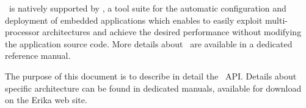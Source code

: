 \ee\ is natively supported by \rtd, a tool suite for the automatic
configuration and deployment of embedded applications which enables to
easily exploit multi-processor architectures and achieve the desired
performance without modifying the application source code. More details
about \rtd\ are available in a dedicated reference manual.

The purpose of this document is to describe in detail the \ee\
API. Details about specific architecture can be found in dedicated manuals,
available for download on the Erika web site.







